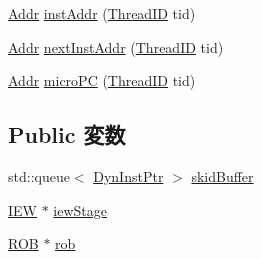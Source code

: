 \begin{DoxyCompactItemize}
\hyperlink{base_2types_8hh_af1bb03d6a4ee096394a6749f0a169232}{Addr} \hyperlink{classDefaultCommit_afae6152cf4b3a51162d6e64247c1ac09}{instAddr} (\hyperlink{base_2types_8hh_ab39b1a4f9dad884694c7a74ed69e6a6b}{ThreadID} tid)
\item 
\hyperlink{base_2types_8hh_af1bb03d6a4ee096394a6749f0a169232}{Addr} \hyperlink{classDefaultCommit_af1caba1f04cf2802d742d1a16b961e79}{nextInstAddr} (\hyperlink{base_2types_8hh_ab39b1a4f9dad884694c7a74ed69e6a6b}{ThreadID} tid)
\item 
\hyperlink{base_2types_8hh_af1bb03d6a4ee096394a6749f0a169232}{Addr} \hyperlink{classDefaultCommit_a697667536e687bd20e95084adc90d820}{microPC} (\hyperlink{base_2types_8hh_ab39b1a4f9dad884694c7a74ed69e6a6b}{ThreadID} tid)
\end{DoxyCompactItemize}
\subsection*{Public 変数}
\begin{DoxyCompactItemize}
\item 
std::queue$<$ \hyperlink{classDefaultCommit_a028ce10889c5f6450239d9e9a7347976}{DynInstPtr} $>$ \hyperlink{classDefaultCommit_ab9508ede35e5a000089a1450342412be}{skidBuffer}
\item 
\hyperlink{classDefaultCommit_a2e298f790f528754f0e0ffa0cb8088f6}{IEW} $\ast$ \hyperlink{classDefaultCommit_a4e9ef25d8913b270d432be4bbfe4965c}{iewStage}
\item 
\hyperlink{classROB}{ROB} $\ast$ \hyperlink{classDefaultCommit_a74983e0d923870864acf5b5477449d48}{rob}
\end{DoxyCompactItemize}
